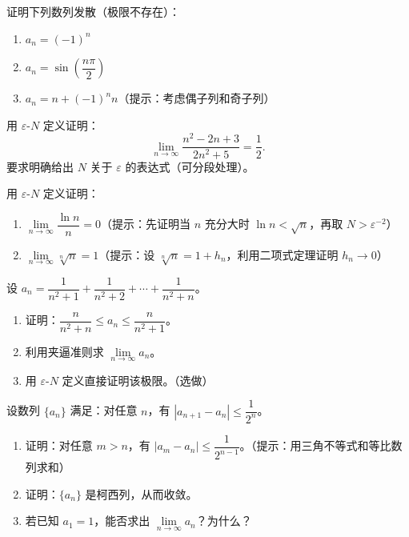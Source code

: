 \documentclass[fontset=fandol]{ctexart}
\begin{document}
\begin{exercise}
证明下列数列发散（极限不存在）：
\begin{enumerate}
\item \(a_n = (-1)^n\)
\item \(a_n = \sin\left(\dfrac{n\pi}{2}\right)\)
\item \(a_n = n + (-1)^n n\)（提示：考虑偶子列和奇子列）
\end{enumerate}
\end{exercise}

\begin{exercise}
用 \(\varepsilon\)-\(N\) 定义证明：
\[
\lim_{n\to\infty} \dfrac{n^2 - 2n + 3}{2n^2 + 5} = \dfrac{1}{2}.
\]
要求明确给出 \(N\) 关于 \(\varepsilon\) 的表达式（可分段处理）。
\end{exercise}

\begin{exercise}
用 \(\varepsilon\)-\(N\) 定义证明：
\begin{enumerate}
\item \(\lim\limits_{n\to\infty} \dfrac{\ln n}{n} = 0\)（提示：先证明当 \(n\) 充分大时 \(\ln n<\sqrt n\)，再取 \(N>\varepsilon^{-2}\)）
\item \(\lim\limits_{n\to\infty} \sqrt[n]{n} = 1\)（提示：设 \(\sqrt[n]{n} = 1 + h_n\)，利用二项式定理证明 \(h_n \to 0\)）
\end{enumerate}
\end{exercise}

\begin{exercise}
设 \(a_n = \dfrac{1}{n^2 + 1} + \dfrac{1}{n^2 + 2} + \cdots + \dfrac{1}{n^2 + n}\)。
\begin{enumerate}
\item 证明：\(\dfrac{n}{n^2 + n} \leq a_n \leq \dfrac{n}{n^2 + 1}\)。
\item 利用夹逼准则求 \(\lim\limits_{n\to\infty} a_n\)。
\item 用 \(\varepsilon\)-\(N\) 定义直接证明该极限。（选做）
\end{enumerate}
\end{exercise}

\begin{exercise}[*（柯西收敛准则）]
设数列 \(\{a_n\}\) 满足：对任意 \(n\)，有 \(|a_{n+1} - a_n| \leq \dfrac{1}{2^n}\)。
\begin{enumerate}
\item 证明：对任意 \(m > n\)，有 \(|a_m - a_n| \leq \dfrac{1}{2^{n-1}}\)。（提示：用三角不等式和等比数列求和）
\item 证明：\(\{a_n\}\) 是柯西列，从而收敛。
\item 若已知 \(a_1 = 1\)，能否求出 \(\lim\limits_{n\to\infty} a_n\)？为什么？
\end{enumerate}
\end{exercise}
\end{document}
